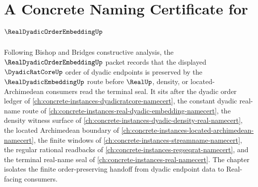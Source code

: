 \chapter{A Concrete Naming Certificate for $\RealDyadicOrderEmbeddingUp$}
\label{ch:concrete-instances-real-dyadic-order-embedding-namecert}

Following Bishop and Bridges constructive analysis, the $\RealDyadicOrderEmbeddingUp$ packet records that the displayed $\DyadicRatCoreUp$ order of dyadic endpoints is preserved by the $\RealDyadicEmbeddingUp$ route before $\RealUp$, density, or located-Archimedean consumers read the terminal seal. It sits after the dyadic order ledger of \autoref{ch:concrete-instances-dyadicratcore-namecert}, the constant dyadic real-name route of \autoref{ch:concrete-instances-real-dyadic-embedding-namecert}, the density witness surface of \autoref{ch:concrete-instances-dyadic-density-real-namecert}, the located Archimedean boundary of \autoref{ch:concrete-instances-located-archimedean-namecert}, the finite windows of \autoref{ch:concrete-instances-streamname-namecert}, the regular rational readbacks of \autoref{ch:concrete-instances-regseqrat-namecert}, and the terminal real-name seal of \autoref{ch:concrete-instances-real-namecert}. The chapter isolates the finite order-preserving handoff from dyadic endpoint data to Real-facing consumers.

